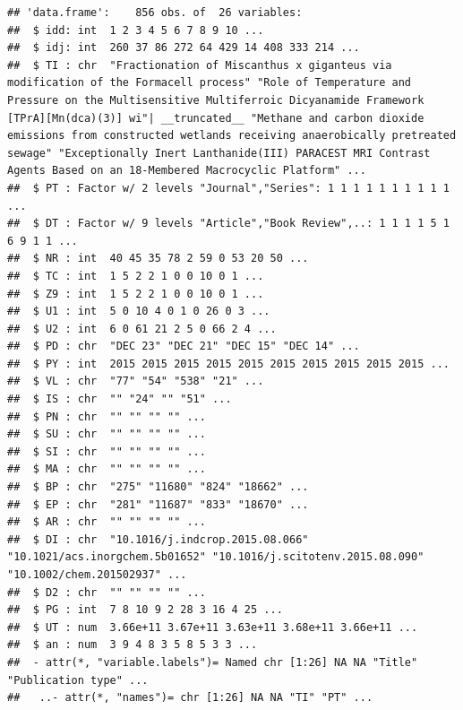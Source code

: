 \documentclass[
]{book}
\newenvironment{Shaded}{\begin{snugshade}}{\end{snugshade}}
\newcommand{\CommentTok}[1]{\textcolor[rgb]{0.56,0.35,0.01}{\textit{#1}}}
\newcommand{\FunctionTok}[1]{\textcolor[rgb]{0.13,0.29,0.53}{\textbf{#1}}}
\newcommand{\NormalTok}[1]{#1}
\newcommand{\SpecialCharTok}[1]{\textcolor[rgb]{0.81,0.36,0.00}{\textbf{#1}}}
\theoremstyle{break}
\theoremstyle{nonumberplain}
\renewcommand{\CommentTok}[1]{\textcolor[rgb]{0.41,0.41,0.41}{\texttt{#1}}}
\begin{document}
\begin{verbatim}
## 'data.frame':    856 obs. of  26 variables:
##  $ idd: int  1 2 3 4 5 6 7 8 9 10 ...
##  $ idj: int  260 37 86 272 64 429 14 408 333 214 ...
##  $ TI : chr  "Fractionation of Miscanthus x giganteus via modification of the Formacell process" "Role of Temperature and Pressure on the Multisensitive Multiferroic Dicyanamide Framework [TPrA][Mn(dca)(3)] wi"| __truncated__ "Methane and carbon dioxide emissions from constructed wetlands receiving anaerobically pretreated sewage" "Exceptionally Inert Lanthanide(III) PARACEST MRI Contrast Agents Based on an 18-Membered Macrocyclic Platform" ...
##  $ PT : Factor w/ 2 levels "Journal","Series": 1 1 1 1 1 1 1 1 1 1 ...
##  $ DT : Factor w/ 9 levels "Article","Book Review",..: 1 1 1 1 5 1 6 9 1 1 ...
##  $ NR : int  40 45 35 78 2 59 0 53 20 50 ...
##  $ TC : int  1 5 2 2 1 0 0 10 0 1 ...
##  $ Z9 : int  1 5 2 2 1 0 0 10 0 1 ...
##  $ U1 : int  5 0 10 4 0 1 0 26 0 3 ...
##  $ U2 : int  6 0 61 21 2 5 0 66 2 4 ...
##  $ PD : chr  "DEC 23" "DEC 21" "DEC 15" "DEC 14" ...
##  $ PY : int  2015 2015 2015 2015 2015 2015 2015 2015 2015 2015 ...
##  $ VL : chr  "77" "54" "538" "21" ...
##  $ IS : chr  "" "24" "" "51" ...
##  $ PN : chr  "" "" "" "" ...
##  $ SU : chr  "" "" "" "" ...
##  $ SI : chr  "" "" "" "" ...
##  $ MA : chr  "" "" "" "" ...
##  $ BP : chr  "275" "11680" "824" "18662" ...
##  $ EP : chr  "281" "11687" "833" "18670" ...
##  $ AR : chr  "" "" "" "" ...
##  $ DI : chr  "10.1016/j.indcrop.2015.08.066" "10.1021/acs.inorgchem.5b01652" "10.1016/j.scitotenv.2015.08.090" "10.1002/chem.201502937" ...
##  $ D2 : chr  "" "" "" "" ...
##  $ PG : int  7 8 10 9 2 28 3 16 4 25 ...
##  $ UT : num  3.66e+11 3.67e+11 3.63e+11 3.68e+11 3.66e+11 ...
##  $ an : num  3 9 4 8 3 5 8 5 3 3 ...
##  - attr(*, "variable.labels")= Named chr [1:26] NA NA "Title" "Publication type" ...
##   ..- attr(*, "names")= chr [1:26] NA NA "TI" "PT" ...
\end{verbatim}

\begin{Shaded}
\end{Shaded}
\end{document}
